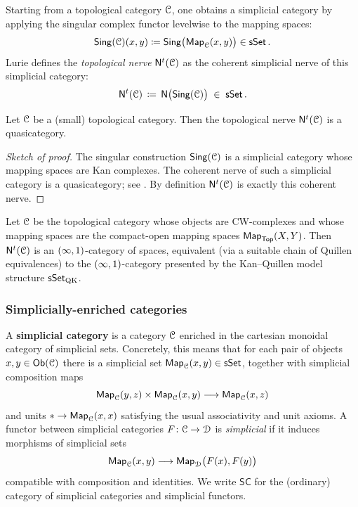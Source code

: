 Starting from a topological category $\mathcal C$, one obtains a simplicial category
by applying the singular complex functor levelwise to the mapping spaces:
\[
  \operatorname{\mathsf{Sing}}(\mathcal C)(x,y) \coloneqq \operatorname{\mathsf{Sing}}\bigl(\operatorname{{\sf Map}}_{\mathcal C}(x,y)\bigr) \in \operatorname{\sf sSet}.
\]
Lurie defines the \emph{topological nerve} $\mathsf N^{t}(\mathcal C)$ as the coherent
simplicial nerve of this simplicial category:
\[
  \mathsf N^{t}(\mathcal C) \,\coloneqq\, \mathsf N\bigl(\operatorname{\mathsf{Sing}}(\mathcal C)\bigr) \;\in\; \operatorname{\sf sSet}.
\]

\begin{proposition}
  Let $\mathcal C$ be a (small) topological category.  Then the topological nerve
  $\mathsf N^{t}(\mathcal C)$ is a quasicategory.
\end{proposition}

\begin{proof}[Sketch of proof]
  The singular construction $\operatorname{\mathsf{Sing}}(\mathcal C)$ is a simplicial category whose
  mapping spaces are Kan complexes.  The coherent nerve of such a simplicial
  category is a quasicategory; see \cite[§1.1.5]{HTT}.  By definition
  $\mathsf N^t(\mathcal C)$ is exactly this coherent nerve.
\end{proof}

\begin{example}
  Let $\mathcal C$ be the topological category whose objects are CW-complexes and
  whose mapping spaces are the compact-open mapping spaces
  $\operatorname{{\sf Map}}_{\operatorname{\mathsf{Top}}}(X,Y)$.  Then $\mathsf N^{t}(\mathcal C)$ is an $(\operatorname{\infty},1)$-category of spaces,
  equivalent (via a suitable chain of Quillen equivalences) to the
  $(\operatorname{\infty},1)$-category presented by the Kan--Quillen model structure
  $\operatorname{\sf sSet}_{\mathrm{QK}}$.
\end{example}


\subsubsection{Simplicially-enriched categories}

\begin{definition}
  A \textbf{simplicial category} is a category $\mathcal C$ enriched in the cartesian
  monoidal category of simplicial sets.  Concretely, this means that for each
  pair of objects $x,y \in \operatorname{{\sf Ob}}(\mathcal C)$ there is a simplicial set
  $\operatorname{{\sf Map}}_{\mathcal C}(x,y) \in \operatorname{\sf sSet}$, together with simplicial composition maps
  \[
    \operatorname{{\sf Map}}_{\mathcal C}(y,z) \times \operatorname{{\sf Map}}_{\mathcal C}(x,y)
    \longrightarrow
    \operatorname{{\sf Map}}_{\mathcal C}(x,z)
  \]
  and units $*\to\operatorname{{\sf Map}}_{\mathcal C}(x,x)$ satisfying the usual associativity and unit
  axioms.  A functor between simplicial categories
  $F \colon \mathcal C \to \mathcal D$ is \emph{simplicial} if it induces morphisms of
  simplicial sets
  \[
    \operatorname{{\sf Map}}_{\mathcal C}(x,y) \longrightarrow \operatorname{{\sf Map}}_{\mathcal D}\bigl(F(x),F(y)\bigr)
  \]
  compatible with composition and identities.  We write $\mathsf{SC}$ for the
  (ordinary) category of simplicial categories and simplicial functors.
\end{definition}

